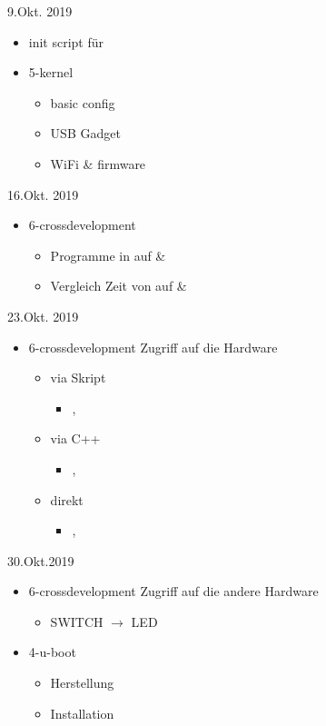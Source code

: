 \documentclass{beamer}
\begin{document}
\begin{frame}{9.Okt. 2019}
 \begin{itemize}
  \item init script für \targetS
  \item 5-kernel
  \begin{itemize}
   \item basic config
   \item USB Gadget
   \item WiFi \& firmware
  \end{itemize}
 \end{itemize}
\end{frame}

\begin{frame}{16.Okt. 2019}
 \begin{itemize}
  \item 6-crossdevelopment
  \begin{itemize}
   \item Programme in  auf \host \& \targetS
   \item Vergleich Zeit von  auf \host \& \targetS
  \end{itemize}
 \end{itemize}
\end{frame}

\begin{frame}{23.Okt. 2019}
 \begin{itemize}
  \item 6-crossdevelopment Zugriff auf die Hardware
  \begin{itemize}
   \item via Skript 
   \begin{itemize}
    \item {}, 
   \end{itemize}
   \item via C++ 
   \begin{itemize}
    \item {}, 
   \end{itemize}
   \item direkt 
   \begin{itemize}
    \item {}, 
   \end{itemize}
  \end{itemize}
 \end{itemize}
\end{frame}

\begin{frame}{30.Okt.2019}
 \begin{itemize}
  \item 6-crossdevelopment Zugriff auf die andere Hardware
  \begin{itemize}
   \item SWITCH $\to$ LED
  \end{itemize}
  \item 4-u-boot
  \begin{itemize}
   \item Herstellung
   \item Installation
  \end{itemize}
 \end{itemize}
\end{frame}
\end{document}
